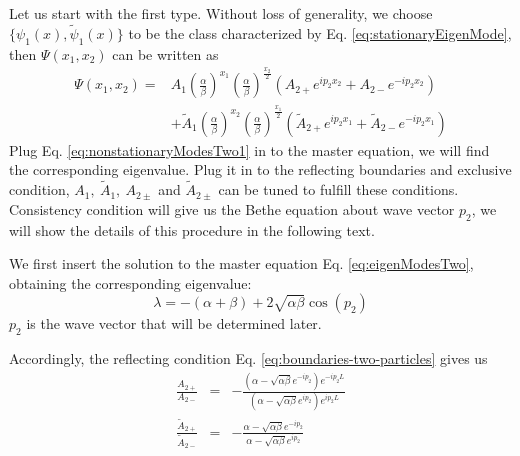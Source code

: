 \documentclass[12pt,a4paper]{article}
\begin{document}
Let us start with the first type. Without loss of generality, we choose
$\{\psi_1(x), \tilde{\psi}_1(x)\}$ to be the class characterized by Eq.
\eqref{eq:stationaryEigenMode}, then $\Psi(x_1, x_2)$ can be written as
\begin{equation}
    \begin{aligned}
        \label{eq:nonstationaryModesTwo1}
        \Psi(x_1, x_2) = & A_{1}\left(\frac{\alpha}{\beta}\right)^{x_1} 
        \left(\frac{\alpha}{\beta}\right)^{\frac{x_2}{2}} \left( A_{2+} 
            e^{ip_2 x_2} + A_{2-} e^{-ip_2 x_2}\right) \\
        & + \tilde{A}_{1}\left(\frac{\alpha}{\beta}\right)^{x_2} \left(
            \frac{\alpha}{\beta}\right)^{\frac{x_1}{2}} \left( \tilde{A}_{2+}
            e^{ip_2 x_1} + \tilde{A}_{2-} e^{-ip_2 x_1}\right) 
    \end{aligned}
\end{equation}
Plug Eq. \eqref{eq:nonstationaryModesTwo1} in to the master equation, we will
find the corresponding eigenvalue. Plug it in to the reflecting boundaries and
exclusive condition, $A_{1},~\tilde{A}_{1},~A_{2\pm}$ and $\tilde{A}_{2\pm}$ can
be tuned to fulfill these conditions. Consistency condition will give us the
Bethe equation about wave vector $p_2$, we will show the details of this
procedure in the following text.

We first insert the solution to the master equation Eq. \eqref{eq:eigenModesTwo},
obtaining the corresponding eigenvalue:
\begin{equation}
    \label{eq:eigenvaluesTwo1}
    \lambda = -(\alpha+\beta) + 2\sqrt{\alpha\beta}\cos(p_2)
\end{equation} 
$p_2$ is the wave vector that will be determined later. 

Accordingly, the reflecting condition Eq. \eqref{eq:boundaries-two-particles}
gives us
\begin{subequations}
    \label{eq:scatterFactorBoundary}
    \begin{eqnarray}
        \frac{A_{2+}}{A_{2-}} & = & -\frac{\left(\alpha-\sqrt{\alpha\beta}
                e^{-ip_2}\right) e^{-ip_2L}}{\left(\alpha-\sqrt{\alpha\beta} 
                e^{ip_2}\right) e^{ip_2L}}  \\
        \frac{\tilde{A}_{2+}}{\tilde{A}_{2-}} & = & -\frac{\alpha -
            \sqrt{\alpha\beta} e^{-ip_2}}{\alpha-\sqrt{\alpha\beta} e^{ip_2}} 
    \end{eqnarray}
\end{subequations}
\end{document}

